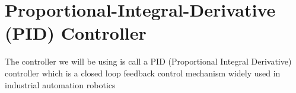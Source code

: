 \section{Proportional-Integral-Derivative (PID) Controller}
The controller we will be using is call a PID (Proportional Integral Derivative)  controller
which is a closed loop feedback control mechanism widely used in industrial automation robotics


